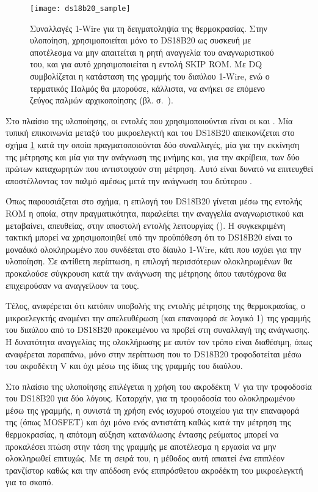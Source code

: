 \begin{figure}
    \caption{Συναλλαγές 1-Wire για τη δειγματοληψία της θερμοκρασίας.
    Στην υλοποίηση, χρησιμοποιείται μόνο το DS18B20 ως  συσκευή με
    αποτέλεσμα να μην απαιτείται η ρητή αναγγελία του αναγνωριστικού του, και
    για αυτό χρησιμοποιείται η εντολή SKIP ROM. Με DQ συμβολίζεται η κατάσταση
    της γραμμής του διαύλου 1-Wire, ενώ ο τερματικός Παλμός  θα
    μπορούσε, κάλλιστα, να ανήκει σε επόμενο ζεύγος παλμών αρχικοποίησης
    (βλ. σ.~\pageref{ssubsec:1-wire:initialisation}).
    \label{fig:ds18b20:sample}}
    \begin{center}
    \texttt{[image: ds18b20\_sample]}
    \end{center}
\end{figure}

Στο πλαίσιο της υλοποίησης, οι εντολές που χρησιμοποιούνται είναι οι  και . Μία τυπική επικοινωνία μεταξύ του μικροελεγκτή και
του DS18B20 απεικονίζεται στο σχήμα \ref{fig:ds18b20:sample} κατά την οποία
πραγματοποιούνται δύο συναλλαγές, μία για την εκκίνηση της μέτρησης και μία για
την ανάγνωση της μνήμης και, για την ακρίβεια, των δύο πρώτων καταχωρητών που
αντιστοιχούν στη μέτρηση. Αυτό είναι δυνατό να επιτευχθεί αποστέλλοντας τον
παλμό  αμέσως μετά την ανάγνωση του δεύτερου .

Όπως παρουσιάζεται στο σχήμα, η επιλογή του DS18B20 γίνεται μέσω της εντολής
 ROM η οποία, στην πραγματικότητα, παραλείπει την αναγγελία
αναγνωριστικού και μεταβαίνει, απευθείας, στην αποστολή εντολής λειτουργίας
(). Η συγκεκριμένη τακτική μπορεί να χρησιμοποιηθεί υπό την
προϋπόθεση ότι το DS18B20 είναι το μοναδικό ολοκληρωμένο που συνδέεται στο
δίαυλο 1-Wire, κάτι που ισχύει για την υλοποίηση. Σε αντίθετη περίπτωση, η
επιλογή περισσότερων ολοκληρωμένων θα προκαλούσε σύγκρουση κατά την ανάγνωση της
μέτρησης όπου ταυτόχρονα θα επιχειρούσαν να αναγγείλουν τα  τους.

Τέλος, αναφέρεται ότι κατόπιν υποβολής της εντολής μέτρησης της θερμοκρασίας, ο
μικροελεγκτής αναμένει την απελευθέρωση (και επαναφορά σε λογικό 1) της γραμμής
του διαύλου από το DS18B20 προκειμένου να προβεί στη συναλλαγή της ανάγνωσης. Η
δυνατότητα αναγγελίας της ολοκλήρωσης με αυτόν τον τρόπο είναι διαθέσιμη, όπως
αναφέρεται παραπάνω, μόνο στην περίπτωση που το DS18B20 τροφοδοτείται μέσω του
ακροδέκτη V και όχι μέσω της ίδιας της γραμμής του διαύλου.

Στο πλαίσιο της υλοποίησης επιλέγεται η χρήση του ακροδέκτη V για την
τροφοδοσία του DS18B20 για δύο λόγους.
Καταρχήν, για τη τροφοδοσία του ολοκληρωμένου μέσω της γραμμής, η
\textcite[5]{ds18b20} συνιστά τη χρήση ενός ισχυρού στοιχείου για την επαναφορά
της (όπως MOSFET) και όχι μόνο ενός αντιστάτη καθώς κατά την μέτρηση της
θερμοκρασίας, η απότομη αύξηση κατανάλωσης έντασης ρεύματος μπορεί να προκαλέσει
πτώση στην τάση της γραμμής με αποτέλεσμα η εργασία να μην ολοκληρωθεί επιτυχώς.
Με τη σειρά του, η μέθοδος αυτή απαιτεί ένα επιπλέον τρανζίστορ καθώς και την
απόδοση ενός επιπρόσθετου ακροδέκτη του μικροελεγκτή για το σκοπό.


